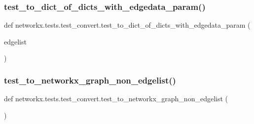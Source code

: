 \subsubsection{\texorpdfstring{test\+\_\+to\+\_\+dict\+\_\+of\+\_\+dicts\+\_\+with\+\_\+edgedata\+\_\+param()}{test\_to\_dict\_of\_dicts\_with\_edgedata\_param()}}
{\footnotesize\ttfamily def networkx.\+tests.\+test\+\_\+convert.\+test\+\_\+to\+\_\+dict\+\_\+of\+\_\+dicts\+\_\+with\+\_\+edgedata\+\_\+param (\begin{DoxyParamCaption}\item[{}]{edgelist }\end{DoxyParamCaption})}

\mbox{\label{namespacenetworkx_1_1tests_1_1test__convert_a5056b4e80c262016d3314bb2cc9dc854}} 
\subsubsection{\texorpdfstring{test\+\_\+to\+\_\+networkx\+\_\+graph\+\_\+non\+\_\+edgelist()}{test\_to\_networkx\_graph\_non\_edgelist()}}
{\footnotesize\ttfamily def networkx.\+tests.\+test\+\_\+convert.\+test\+\_\+to\+\_\+networkx\+\_\+graph\+\_\+non\+\_\+edgelist (\begin{DoxyParamCaption}{ }\end{DoxyParamCaption})}

